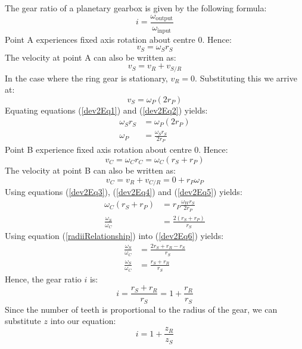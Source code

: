 \documentclass[12pt]{article}
\numberwithin{equation}{section}
\begin{document}
\begin{flushleft}
The gear ratio of a planetary gearbox is given by the following formula:
\begin{equation}
  i = \frac{\omega_{\textrm{output}}}{\omega_{\textrm{input}}}
  \label{gearRatio}
\end{equation}
Point A experiences fixed axis rotation about centre $0$. Hence:
\begin{equation}
  v_S = \omega_S r_S
  \label{dev2Eq1}
\end{equation}
The velocity at point A can also be written as:
\begin{equation}
  v_S = v_R + v_{S/R}
\end{equation}
In the case where the ring gear is stationary, \(v_R = 0\). Substituting this we arrive at:
\begin{equation}
  v_S = \omega_P(2r_P)
  \label{dev2Eq2}
\end{equation}
Equating equations (\ref{dev2Eq1}) and (\ref{dev2Eq2}) yields:
\begin{align}
  \omega_S r_S &= \omega_P (2r_P)\\
  \omega_P &= \frac{\omega_S r_S}{2r_P} \label{dev2Eq3}
\end{align}
Point B experience fixed axis rotation about centre $0$. Hence: 
\begin{equation}
  v_C = \omega_C r_C = \omega_C (r_S + r_P) \label{dev2Eq4}
\end{equation}
The velocity at point B can also be written as:
\begin{equation}
  v_C = v_R + v_{C/R} = 0 + r_P \omega_P \label{dev2Eq5}
\end{equation}
Using equations (\ref{dev2Eq3}), (\ref{dev2Eq4}) and (\ref{dev2Eq5}) yields:
\begin{align}
  \omega_C (r_S + r_P) &= r_P \frac{\omega_W r_S}{2r_P}\\
  \frac{\omega_S}{\omega_C} &= \frac{2(r_S + r_P)}{r_S} \label{dev2Eq6}
\end{align}
Using equation (\ref{radiiRelationship}) into (\ref{dev2Eq6}) yields:
\begin{align}
  \frac{\omega_S}{\omega_C} &= \frac{2r_S + r_R - r_S}{r_S}\\
  \frac{\omega_S}{\omega_C} &= \frac{r_S + r_R}{r_S}
\end{align}
Hence, the gear ratio $i$ is:
\begin{equation}
  i = \frac{r_S + r_R}{r_S} = 1 + \frac{r_R}{r_S}
\end{equation}
Since the number of teeth is proportional to the radius of the gear, we can substitute $z$ into our equation:
\begin{equation}
  i = 1 + \frac{z_R}{z_S}
\end{equation}

\end{flushleft}
\end{document}

